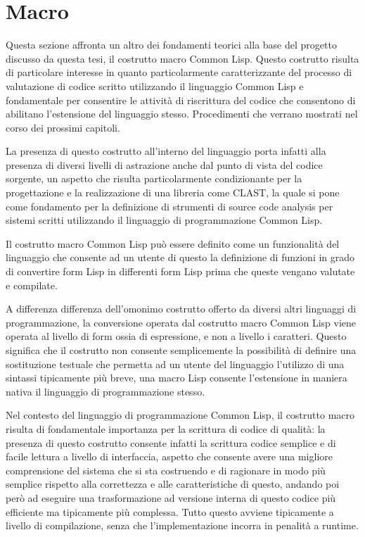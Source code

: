 \section{Macro}
\label{macro}

Questa sezione affronta un altro dei fondamenti teorici alla base del progetto
discusso da questa tesi, il costrutto macro Common Lisp. Questo costrutto
risulta di particolare interesse in quanto particolarmente caratterizzante del
processo di valutazione di codice scritto utilizzando il linguaggio Common Lisp
e fondamentale per consentire le attività di riscrittura del codice che
consentono di abilitano l’estensione del linguaggio stesso. Procedimenti che
verrano mostrati nel corso dei prossimi capitoli.

La presenza di questo costrutto all'interno del linguaggio porta infatti alla
presenza di diversi livelli di astrazione anche dal punto di vista del codice
sorgente, un aspetto che risulta particolarmente condizionante per la
progettazione e la realizzazione di una libreria come CLAST, la quale si pone
come fondamento per la definizione di strumenti di source code analysis per
sistemi scritti utilizzando il linguaggio di programmazione Common Lisp.

Il costrutto macro Common Lisp può essere definito come un funzionalità del
linguaggio che consente ad un utente di questo la definizione di funzioni in
grado di convertire form Lisp in differenti form Lisp prima che queste vengano
valutate e compilate.

A differenza differenza dell'omonimo costrutto offerto da diversi altri
linguaggi di programmazione, la conversione operata dal costrutto macro Common
Lisp viene operata al livello di form ossia di espressione, e non a livello i
caratteri. Questo significa che il costrutto non consente semplicemente la
possibilità di definire una sostituzione testuale che permetta ad un utente del
linguaggio l’utilizzo di una sintassi tipicamente più breve, una macro Lisp
consente l'estensione in maniera nativa il linguaggio di programmazione
stesso.

Nel contesto del linguaggio di programmazione Common Lisp, il costrutto macro
risulta di fondamentale importanza per la scrittura di codice di qualità: la
presenza di questo costrutto consente infatti la scrittura codice semplice e di
facile lettura a livello di interfaccia, aspetto che consente avere una migliore
comprensione del sistema che si sta costruendo e di ragionare in modo più
semplice rispetto alla correttezza e alle caratteristiche di questo, andando poi
però ad eseguire una trasformazione ad versione interna di questo codice più
efficiente ma tipicamente più complessa. Tutto questo avviene tipicamente a
livello di compilazione, senza che l'implementazione incorra in penalità a
runtime.

